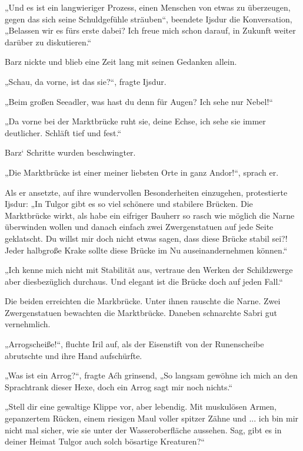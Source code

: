„Und es ist ein langwieriger Prozess, einen Menschen von etwas zu überzeugen, gegen das sich seine Schuldgefühle sträuben“, beendete Ijsdur die Konversation, „Belassen wir es fürs erste dabei? Ich freue mich schon darauf, in Zukunft weiter darüber zu diskutieren.“

Barz nickte und blieb eine Zeit lang mit seinen Gedanken allein.

„Schau, da vorne, ist das sie?“, fragte Ijsdur.

„Beim großen Seeadler, was hast du denn für Augen? Ich sehe nur Nebel!“

„Da vorne bei der Marktbrücke ruht sie, deine Echse, ich sehe sie immer deutlicher. Schläft tief und fest.“

Barz‘ Schritte wurden beschwingter.

„Die Marktbrücke ist einer meiner liebsten Orte in ganz Andor!“, sprach er.

Als er ansetzte, auf ihre wundervollen Besonderheiten einzugehen, protestierte Ijsdur: „In Tulgor gibt es so viel schönere und stabilere Brücken. Die Marktbrücke wirkt, als habe ein eifriger Bauherr so rasch wie möglich die Narne überwinden wollen und danach einfach zwei Zwergenstatuen auf jede Seite geklatscht. Du willst mir doch nicht etwas sagen, dass diese Brücke stabil sei?! Jeder halbgroße Krake sollte diese Brücke im Nu auseinandernehmen können.“

„Ich kenne mich nicht mit Stabilität aus, vertraue den Werken der Schildzwerge aber diesbezüglich durchaus. Und elegant ist die Brücke doch auf jeden Fall.“

Die beiden erreichten die Markbrücke. Unter ihnen rauschte die Narne. Zwei Zwergenstatuen bewachten die Marktbrücke. Daneben schnarchte Sabri gut vernehmlich.



\trennzeichen



„Arrogscheiße!“, fluchte Iril auf, als der Eisenstift von der Runenscheibe abrutschte und ihre Hand aufschürfte.

„Was ist ein Arrog?“, fragte Aćh grinsend, „So langsam gewöhne ich mich an den Sprachtrank dieser Hexe, doch ein Arrog sagt mir noch nichts.“

„Stell dir eine gewaltige Klippe vor, aber lebendig. Mit muskulösen Armen, gepanzertem Rücken, einem riesigen Maul voller spitzer Zähne und ... ich bin mir nicht mal sicher, wie sie unter der Wasseroberfläche aussehen. Sag, gibt es in deiner Heimat Tulgor auch solch bösartige Kreaturen?“

